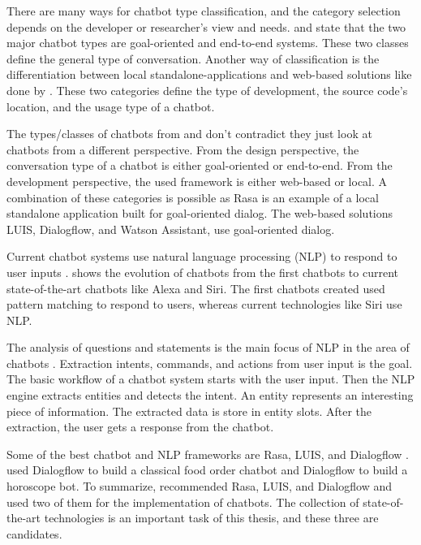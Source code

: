 There are many ways for chatbot type classification, and the category selection depends on the developer or researcher's view and needs.
\citet{williams2017hybrid} and \citet{bordes2016learning} state that the two major chatbot types are goal-oriented and end-to-end systems.
These two classes define the general type of conversation.
Another way of classification is the differentiation between local standalone-applications and web-based solutions like done by \citet{kane2016role}.
These two categories define the type of development, the source code's location, and the usage type of a chatbot.

The types/classes of chatbots from \citet{williams2017hybrid, bordes2016learning} and \citet{kane2016role} don't contradict they just look at chatbots from a different perspective.
From the design perspective, the conversation type of a chatbot is either goal-oriented or end-to-end.
From the development perspective, the used framework is either web-based or local.
A combination of these categories is possible as Rasa is an example of a local standalone application built for goal-oriented dialog.
The web-based solutions LUIS, Dialogflow, and Watson Assistant, use goal-oriented dialog.

Current chatbot systems use natural language processing (NLP) to respond to user inputs \cite{deshpande2017survey}.
\citet{deshpande2017survey} shows the evolution of chatbots from the first chatbots to current state-of-the-art chatbots like Alexa and Siri.
The first chatbots created used pattern matching to respond to users, whereas current technologies like Siri use NLP.

The analysis of questions and statements is the main focus of NLP in the area of chatbots \cite{deshpande2017survey}.
Extraction intents, commands, and actions from user input is the goal.
The basic workflow of a chatbot system starts with the user input. 
Then the NLP engine extracts entities and detects the intent.
An entity represents an interesting piece of information.
The extracted data is store in entity slots.
After the extraction, the user gets a response from the chatbot.

Some of the best chatbot and NLP frameworks are Rasa, LUIS, and Dialogflow \cite{buiildChatbotsPython}.
\citet{buiildChatbotsPython} used Dialogflow to build a classical food order chatbot and Dialogflow to build a horoscope bot.
To summarize, \citet{buiildChatbotsPython} recommended Rasa, LUIS, and Dialogflow and used two of them for the implementation of chatbots.
The collection of state-of-the-art technologies is an important task of this thesis, and these three are candidates.

